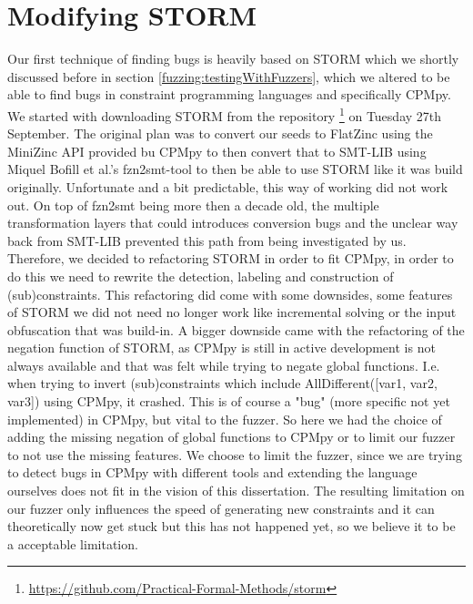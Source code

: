 
\section{Modifying STORM}
\label{impl:modifyingSTROM}
Our first technique of finding bugs is heavily based on STORM which we shortly discussed before in section \ref{fuzzing:testingWithFuzzers}, which we altered to be able to find bugs in constraint programming languages and specifically CPMpy. We started with downloading STORM from the repository \footnote{\url{https://github.com/Practical-Formal-Methods/storm}} on Tuesday 27th September.
The original plan was to convert our seeds to FlatZinc using the MiniZinc API provided bu CPMpy to then convert that to SMT-LIB \cite{72bofill2010system} using Miquel Bofill et al.'s fzn2smt-tool to then be able to use STORM like it was build originally. Unfortunate and a bit predictable, this way of working did not work out. On top of fzn2smt being more then a decade old, the multiple transformation layers that could introduces conversion bugs and the unclear way back from SMT-LIB prevented this path from being investigated by us.
Therefore, we decided to refactoring STORM in order to fit CPMpy, in order to do this we need to rewrite the detection, labeling and construction of (sub)constraints. This refactoring did come with some downsides, some features of STORM we did not need no longer work like incremental solving or  the input obfuscation that was build-in. A bigger downside came with the refactoring of the negation function of STORM, as CPMpy is still in active development is not always available and that was felt while trying to negate global functions. I.e. when trying to invert (sub)constraints which include AllDifferent([var1, var2, var3]) using CPMpy, it crashed. This is of course a "bug" (more specific not yet implemented) in CPMpy, but vital to the fuzzer. So here we had the choice of adding the missing negation of global functions to CPMpy or to limit our fuzzer to not use the missing features. We choose to limit the fuzzer, since we are trying to detect bugs in CPMpy with different tools and extending the language ourselves does not fit in the vision of this dissertation. The resulting limitation on our fuzzer only influences the speed of generating new constraints and it can theoretically now get stuck but this has not happened yet, so we believe it to be a acceptable limitation.


